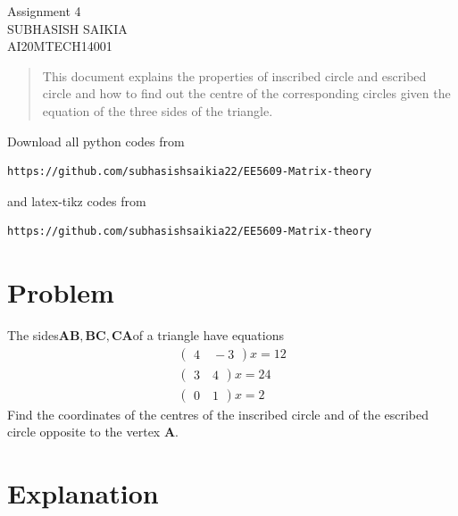 \documentclass[journal,12pt,twocolumn]{IEEEtran}
\newcommand{\myvec}[1]{\ensuremath{\begin{pmatrix}#1\end{pmatrix}}}
\numberwithin{equation}{subsection}
\let\vec\mathbf
\begin{document}
\begin{center}
\huge Assignment 4\\
\large SUBHASISH SAIKIA\\
\large AI20MTECH14001\\
\end{center}
\vspace{0.5cm}
\begin{abstract}
This document explains the properties of inscribed circle and  escribed circle and how to find out the centre of the corresponding circles given the equation of the three sides of the triangle. 
\end{abstract}
\vspace{0.5cm}
Download all python codes from 
\begin{lstlisting}
https://github.com/subhasishsaikia22/EE5609-Matrix-theory
\end{lstlisting}
%
and latex-tikz codes from 
\begin{lstlisting}
https://github.com/subhasishsaikia22/EE5609-Matrix-theory
\end{lstlisting}
%
\vspace{0.5cm}
\section{Problem}
The sides$ \vec{AB},\vec{BC}, \vec{CA} $of a triangle have equations
\begin{align}
    \myvec{4\quad-3}x=12\\
    \myvec{3\quad4}x=24 \\ 
    \myvec{0\quad1}x=2
\end{align} 
Find the coordinates of the centres of the
inscribed circle and of the escribed circle opposite
to the vertex $\vec{A}$.

\section{Explanation}
\end{document}
